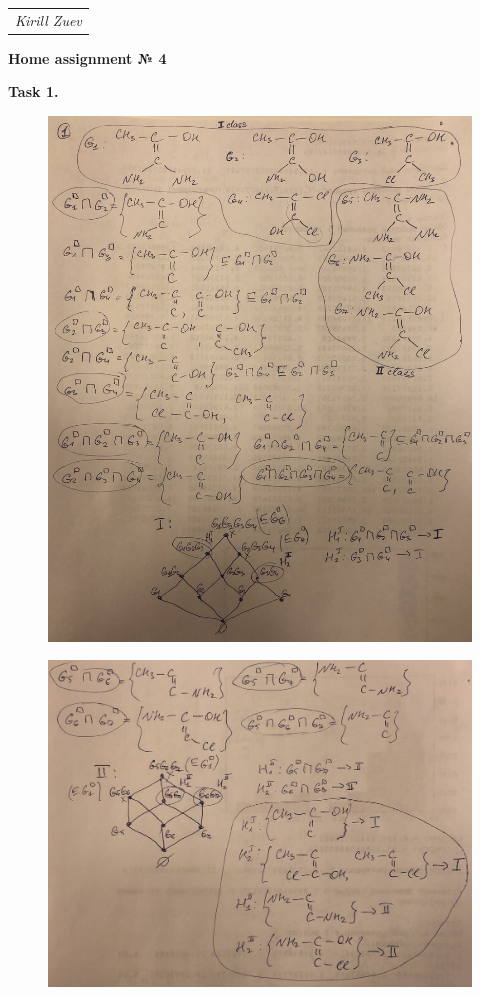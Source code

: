 \documentclass{article}
\begin{document}
\null\hfill\begin{tabular}[t]{l@{}}
	\textit{Kirill Zuev}
\end{tabular}

\begin{center}
	\textbf{Home assignment № 4}
\end{center}

\textbf{Task 1.}

\begin{figure}[h!]
	\includegraphics[width=15cm]{1-1.jpg}
\end{figure}
\begin{figure}[h!]
	\includegraphics[width=15cm]{1-2.jpg}
\end{figure}
\clearpage
\end{document}
